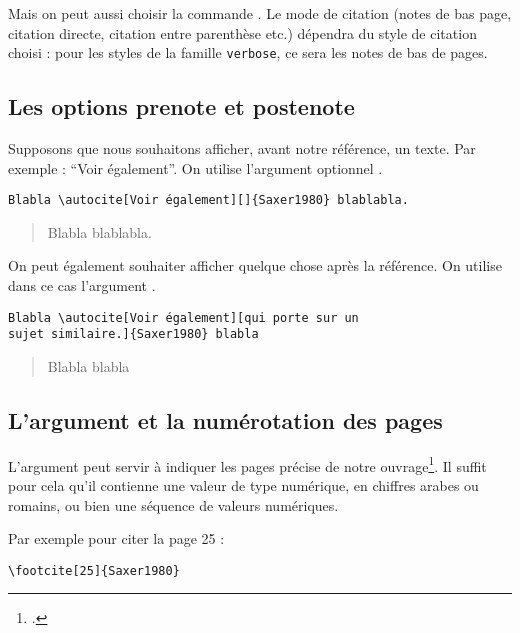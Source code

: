 Mais on peut aussi choisir la commande . Le mode de citation (notes de bas page, citation directe, citation entre parenthèse etc.) dépendra du style de citation choisi : pour les styles de la famille \verb|verbose|, ce sera les notes de bas de pages. 

\subsection{Les options prenote et postenote}

Supposons que nous souhaitons afficher, avant notre référence, un texte. Par exemple : \enquote{Voir également}. On utilise l'argument optionnel .

\begin{verbatim}
Blabla \autocite[Voir également][]{Saxer1980} blablabla.
\end{verbatim}

\begin{quotation}
Blabla \parencite[Voir également][]{Saxer1980} blablabla.
\end{quotation}



On peut également souhaiter afficher quelque chose après la référence. On utilise dans ce cas l'argument .

\begin{verbatim}
Blabla \autocite[Voir également][qui porte sur un
sujet similaire.]{Saxer1980} blabla
\end{verbatim}

\begin{quotation}

	Blabla \parencite[Voir également][qui porte sur un sujet similaire.]{Saxer1980} blabla
\end{quotation}

\subsection{L'argument  et la numérotation des pages}\label{pagespostnote}

L'argument  peut servir à indiquer les pages précise de notre ouvrage\footcite[On consultera pour plus de détails : ][]{biblatex_pages}. Il suffit pour cela qu'il contienne une valeur de type numérique, en chiffres arabes ou romains, ou bien une séquence de valeurs numériques.

Par exemple pour citer la page 25 : 
\begin{verbatim}
\footcite[25]{Saxer1980}
\end{verbatim}

